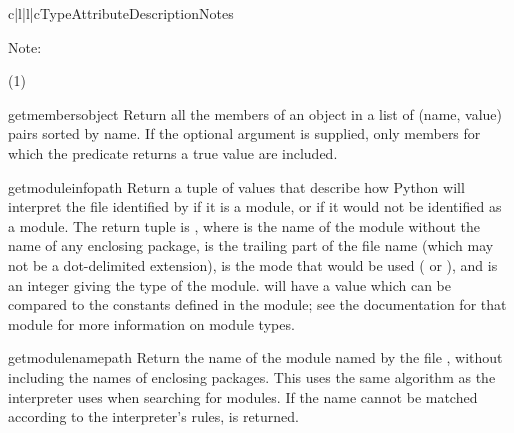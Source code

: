 \begin{tableiv}{c|l|l|c}{}{Type}{Attribute}{Description}{Notes}
  \hline
\end{tableiv}

\noindent
Note:
\begin{description}
\item[(1)]
\end{description}


\begin{funcdesc}{getmembers}{object}
  Return all the members of an object in a list of (name, value) pairs
  sorted by name.  If the optional  argument is supplied,
  only members for which the predicate returns a true value are included.
\end{funcdesc}

\begin{funcdesc}{getmoduleinfo}{path}
  Return a tuple of values that describe how Python will interpret the
  file identified by  if it is a module, or  if
  it would not be identified as a module.  The return tuple is
  , where
   is the name of the module without the name of any
  enclosing package,  is the trailing part of the file
  name (which may not be a dot-delimited extension),  is the
   mode that would be used ( or
  ), and  is an integer giving the type of the
  module.   will have a value which can be compared to the
  constants defined in the  module; see the
  documentation for that module for more information on module types.
\end{funcdesc}

\begin{funcdesc}{getmodulename}{path}
  Return the name of the module named by the file , without
  including the names of enclosing packages.  This uses the same
  algorithm as the interpreter uses when searching for modules.  If
  the name cannot be matched according to the interpreter's rules,
   is returned.
\end{funcdesc}

